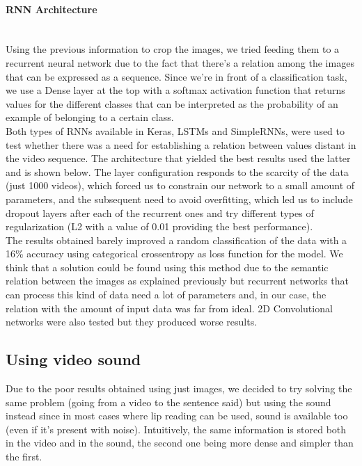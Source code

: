 \documentclass{article}[10pt]
\begin{document}
\begin{multicols}{2}
\paragraph{RNN Architecture} ~\\

Using the previous information to crop the images, we tried feeding them to a
recurrent neural network due to the fact that there's a relation among the
images that can be expressed as a sequence.  Since we're in front of a
classification task, we use a Dense layer at the top with a softmax activation
function that returns values for the different classes that can be interpreted
as the probability of an example of belonging to a certain class.\\

Both types of RNNs available in Keras, LSTMs and SimpleRNNs, were used to test
whether there was a need for establishing a relation between values distant in
the video sequence. The architecture that yielded the best results used the
latter and is shown below. The layer configuration responds to the scarcity of
the data (just 1000 videos), which forced us to constrain our network to a small
amount of parameters, and the subsequent need to avoid overfitting, which led us
to include dropout layers after each of the recurrent ones and try different
types of regularization (L2 with a value of 0.01 providing the best
performance).\\


The results obtained barely improved a random classification of the data with a
16\% accuracy using categorical crossentropy as loss function for the model. We
think that a solution could be found using this method due to the semantic
relation between the images as explained previously but recurrent networks that
can process this kind of data need a lot of parameters and, in our case, the
relation with the amount of input data was far from ideal. 2D Convolutional
networks were also tested but they produced worse results.

\subsection{Using video sound}

Due to the poor results obtained using just images, we decided to try solving
the same problem (going from a video to the sentence said) but using the sound
instead since in most cases where lip reading can be used, sound is available
too (even if it's present with noise). Intuitively, the same information is
stored both in the video and in the sound, the second one being more dense and
simpler than the first.


\end{multicols}
\end{document}
